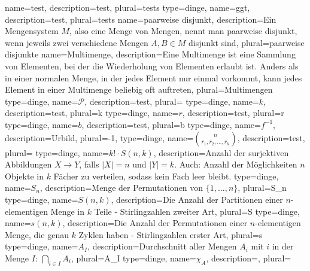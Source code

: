 {
    name={test},
    description={test},
    plural={tests}
}
{
    type=dinge,
    name={ggt},
    description={test},
    plural={tests}
}
{
    name={paarweise disjunkt},
    description={Ein Mengensystem $M$, also eine Menge von Mengen, nennt man \gls{paarweise disjunkt}, wenn jeweils zwei verschiedene Mengen $A, B \in M$ disjunkt sind},
    plural={paarweise disjunkte}
}
{
    name={Multimenge},
    description={Eine Multimenge ist eine Sammlung von Elementen, bei der die
Wiederholung von Elementen erlaubt ist. Anders als in einer normalen Menge, in der
jedes Element nur einmal vorkommt, kann jedes Element in einer Multimenge beliebig
oft auftreten},
    plural={Multimengen}
}
{
    type=dinge,
    name={$\mathcal{P}$},
    description={test},
    plural={}
}
{
    type=dinge,
    name={$k$},
    description={test},
    plural={k}
}
{
    type=dinge,
    name={$r$},
    description={test},
    plural={r}
}
{
    type=dinge,
    name={$b$},
    description={test},
    plural={b}
}
{
    type=dinge,
    name={$f^{-1}$},
    description={Urbild},
    plural={-1},
}
{
    type=dinge,
    name={$\binom{n}{r_1, r_2, \dots, r_k}$},
    description={test},
    plural={}
}
{
    type=dinge,
    name={\( k! \cdot S(n, k) \)},
    description={Anzahl der surjektiven Abbildungen \( X \to Y \), falls \( |X| = n \) und \( |Y| = k \). Auch: Anzahl der Möglichkeiten \( n \) Objekte in \( k \) Fächer zu verteilen, sodass kein Fach leer bleibt.}
}
{
    type=dinge,
    name={$S_n$},
    description={Menge der Permutationen von \( \{1, \dots, n\} \)},
    plural={S_n}
}
{
    type=dinge,
    name={$S(n,k)$},
    description={Die Anzahl der Partitionen einer $n$-elementigen Menge in $k$ Teile - Stirlingzahlen zweiter Art},
    plural={S}
}
{
    type=dinge,
    name={$s(n,k)$},
    description={Die Anzahl der Permutationen einer $n$-elementigen Menge, die genau $k$ Zyklen haben - Stirlingzahlen erster Art},
    plural={s}
}
{
    type=dinge,
    name={$A_I$},
    description={Durchschnitt aller Mengen $A_i$ mit $i$ in der Menge $I$: $\bigcap_{i \in I} A_i$},
    plural={A_I}
}
{
    type=dinge,
    name={$\chi_A$},
    description={},
    plural={\chi}
}

